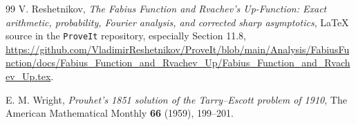 \documentclass[11pt,oneside]{article}
\theoremstyle{definition}
\theoremstyle{remark}
\newcommand{\1}{\mathbf 1}
\begin{document}
\begin{thebibliography}{99}
V. Reshetnikov,
\emph{The Fabius Function and Rvachev's Up-Function: Exact arithmetic, probability, Fourier
analysis, and corrected sharp asymptotics},
LaTeX source in the \texttt{ProveIt} repository, especially Section 11.8,
\url{https://github.com/VladimirReshetnikov/ProveIt/blob/main/Analysis/FabiusFunction/docs/Fabius_Function_and_Rvachev_Up/Fabius_Function_and_Rvachev_Up.tex}.

E. M. Wright,
\emph{Prouhet's 1851 solution of the Tarry--Escott problem of 1910},
The American Mathematical Monthly \textbf{66} (1959), 199--201.

\end{thebibliography}
\end{document}
